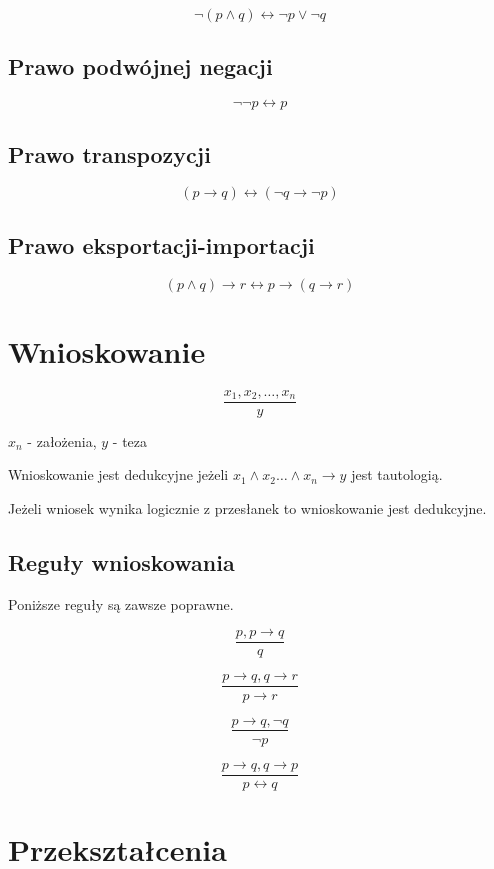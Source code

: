 \documentclass{../notatki}
\begin{document}
$$
\neg (p \land q) \leftrightarrow \neg p \lor \neg q
$$

\subsection{Prawo podwójnej negacji}

$$
\neg \neg p \leftrightarrow p
$$

\subsection{Prawo transpozycji}

$$
(p \rightarrow q) \leftrightarrow (\neg q \rightarrow \neg p)
$$

\subsection{Prawo eksportacji-importacji}

$$
(p \land q) \rightarrow r \leftrightarrow p \rightarrow (q \rightarrow r)
$$

\section{Wnioskowanie}

$$
\frac{x_1, x_2, \ldots, x_n}{y}
$$

$x_n$ - założenia, $y$ - teza

Wnioskowanie jest dedukcyjne jeżeli $x_1 \land x_2 \dots \land x_n
\rightarrow y$ jest tautologią.

Jeżeli wniosek wynika logicznie z przesłanek to wnioskowanie jest dedukcyjne.

\subsection{Reguły wnioskowania}

Poniższe reguły są zawsze poprawne.

$$
\frac{p, p \rightarrow q}{q}
$$

$$
\frac{p\rightarrow q, q \rightarrow r}{p \rightarrow r}
$$

$$
\frac{p \rightarrow q, \neg q}{\neg p}
$$

$$
\frac{p \rightarrow q, q \rightarrow p}{p \leftrightarrow q}
$$

\section{Przekształcenia}
\end{document}
